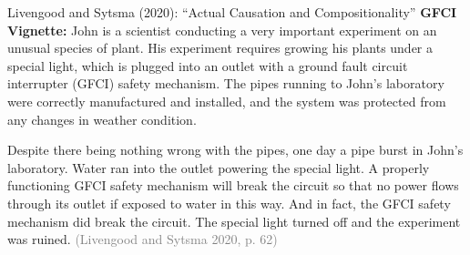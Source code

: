 \documentclass[xcolor=table,9pt,aspectratio=169]{beamer}
\begin{document}
\begin{frame}{\vspace*{10mm}Livengood and Sytsma (2020): ``Actual Causation and Compositionality''}
\vspace*{-5mm}
\textbf{GFCI Vignette:} John is a scientist conducting a very important experiment on an unusual species of plant. His experiment requires growing his plants under a special light, which is plugged into an outlet with a ground fault circuit interrupter (GFCI) safety mechanism. The pipes running to John's laboratory were correctly manufactured and installed, and the system was protected from any changes in weather condition.\par
\hspace{2em}Despite there being nothing wrong with the pipes, one day a pipe burst in John's laboratory. Water ran into the outlet powering the special light. A properly functioning GFCI safety mechanism will break the circuit so that no power flows through its outlet if exposed to water in this way. And in fact, the GFCI safety mechanism did break the circuit. The special light turned off and the experiment was ruined. \textcolor{gray}{(Livengood and Sytsma 2020, p. 62)}
\end{frame}
\end{document}
